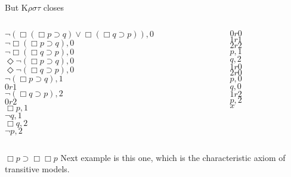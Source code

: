\documentclass[
  14pt,
  letterpaper,
  ignorenonframetext,
]{beamer}
\begin{document}
\begin{frame}
But K\(\rho \sigma \tau\) closes

\begin{columns}[T]
\begin{column}{0.65\textwidth}
\begin{center}
$\neg(\Box(\Box p \supset q) \vee \Box(\Box q \supset p)), 0$ \\
$\neg \Box(\Box p \supset q), 0$ \\
$\neg \Box(\Box q \supset p), 0$ \\
$\Diamond \neg(\Box p \supset q), 0$ \\
$\Diamond \neg(\Box q \supset p), 0$ \\
$\neg(\Box p \supset q), 1$ \\
$0r1$ \\
$\neg(\Box q \supset p), 2$ \\
$0r2$ \\
$\Box p, 1$ \\
$\neg q, 1$ \\
$\Box q, 2$ \\
$\neg p, 2$ \\
\end{center}
\end{column}

\begin{column}{0.35\textwidth}
\begin{center}
$0r0$ \\
$1r1$ \\
$2r2$ \\
$p, 1$ \\
$q, 2$ \\
$1r0$ \\
$2r0$ \\
$p, 0$ \\
$q, 0$ \\
$1r2$ \\
$p, 2$ \\
$x$
\end{center}
\end{column}
\end{columns}
\end{frame}

\begin{frame}{\(\Box p \supset \Box \Box p\)}
\protect\hypertarget{box-p-supset-box-box-p}{}
Next example is this one, which is the characteristic axiom of
transitive models.
\end{frame}
\end{document}
